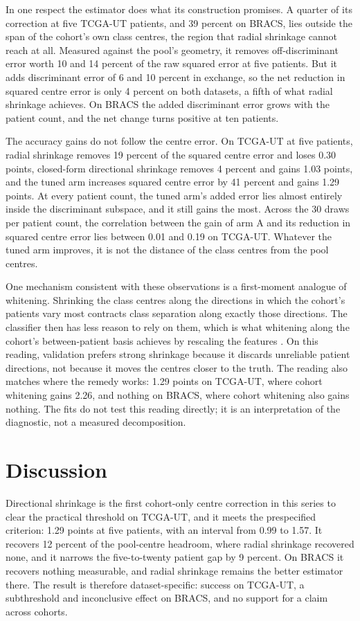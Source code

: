 \noindent In one respect the estimator does what its construction promises. A quarter of its correction at five TCGA-UT patients, and 39 percent on BRACS, lies outside the span of the cohort's own class centres, the region that radial shrinkage cannot reach at all. Measured against the pool's geometry, it removes off-discriminant error worth 10 and 14 percent of the raw squared error at five patients. But it adds discriminant error of 6 and 10 percent in exchange, so the net reduction in squared centre error is only 4 percent on both datasets, a fifth of what radial shrinkage achieves. On BRACS the added discriminant error grows with the patient count, and the net change turns positive at ten patients.

The accuracy gains do not follow the centre error. On TCGA-UT at five patients, radial shrinkage removes 19 percent of the squared centre error and loses 0.30 points, closed-form directional shrinkage removes 4 percent and gains 1.03 points, and the tuned arm increases squared centre error by 41 percent and gains 1.29 points. At every patient count, the tuned arm's added error lies almost entirely inside the discriminant subspace, and it still gains the most. Across the 30 draws per patient count, the correlation between the gain of arm A and its reduction in squared centre error lies between 0.01 and 0.19 on TCGA-UT. Whatever the tuned arm improves, it is not the distance of the class centres from the pool centres.

One mechanism consistent with these observations is a first-moment analogue of whitening. Shrinking the class centres along the directions in which the cohort's patients vary most contracts class separation along exactly those directions. The classifier then has less reason to rely on them, which is what whitening along the cohort's between-patient basis achieves by rescaling the features \citep{queisler2026patientDirections}. On this reading, validation prefers strong shrinkage because it discards unreliable patient directions, not because it moves the centres closer to the truth. The reading also matches where the remedy works: 1.29 points on TCGA-UT, where cohort whitening gains 2.26, and nothing on BRACS, where cohort whitening also gains nothing. The fits do not test this reading directly; it is an interpretation of the diagnostic, not a measured decomposition.

\section{Discussion}
\label{sec:discussion}
Directional shrinkage is the first cohort-only centre correction in this series to clear the practical threshold on TCGA-UT, and it meets the prespecified criterion: 1.29 points at five patients, with an interval from 0.99 to 1.57. It recovers 12 percent of the pool-centre headroom, where radial shrinkage recovered none, and it narrows the five-to-twenty patient gap by 9 percent. On BRACS it recovers nothing measurable, and radial shrinkage remains the better estimator there. The result is therefore dataset-specific: success on TCGA-UT, a subthreshold and inconclusive effect on BRACS, and no support for a claim across cohorts.

